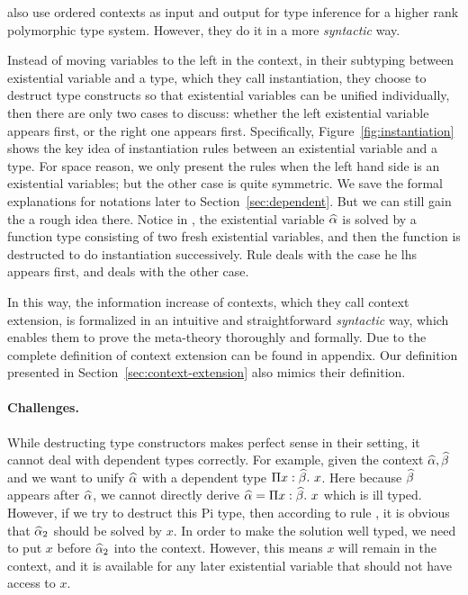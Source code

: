 \citet{dunfield2013complete} also use ordered contexts as input and output for
type inference for a higher rank polymorphic type system. However, they do it in
a more \textit{syntactic} way.

Instead of moving variables to the left in the context, in their subtyping
between existential variable and a type, which they call instantiation, they
choose to destruct type constructs so that existential variables can be unified
individually, then there are only two cases to discuss: whether the left
existential variable appears first, or the right one appears first.
Specifically, Figure~\ref{fig:instantiation} shows the key idea of instantiation
rules between an existential variable and a type. For space reason, we only
present the rules when the left hand side is an existential variables; but the
other case is quite symmetric. We save the formal explanations for notations
later to Section~\ref{sec:dependent}. But we can still gain the a rough idea
there. Notice in , the existential variable $\widehat{\alpha}$ is solved by a
function type consisting of two fresh existential variables, and then the
function is destructed to do instantiation successively. Rule 
deals with the case he lhs appears first, and  deals with the
other case.

In this way, the information increase of contexts, which they call context
extension, is formalized in an intuitive and straightforward \textit{syntactic}
way, which enables them to prove the meta-theory thoroughly and formally. Due to
the complete definition of context extension can be found in appendix. Our
definition presented in Section~\ref{sec:context-extension} also mimics their
definition.

\paragraph{Challenges.} While destructing type constructors makes perfect sense
in their setting, it cannot deal with dependent types correctly. For example,
given the context $\widehat{\alpha}, \widehat{\beta}$ and we want to unify $\widehat{\alpha}$ with a dependent
type $\Pi x:\widehat{\beta}.~ x$. Here because $\widehat{\beta}$ appears after $\widehat{\alpha}$, we cannot
directly derive $\widehat{\alpha} = \Pi x:\widehat{\beta}.~ x$ which is ill typed. However, if we try
to destruct this Pi type, then according to rule , it is obvious
that $\widehat{\alpha}_2$ should be solved by $x$. In order to make the solution well
typed, we need to put $x$ before $\widehat{\alpha}_2$ into the context. However, this means
$x$ will remain in the context, and it is available for any later existential
variable that should not have access to $x$.

